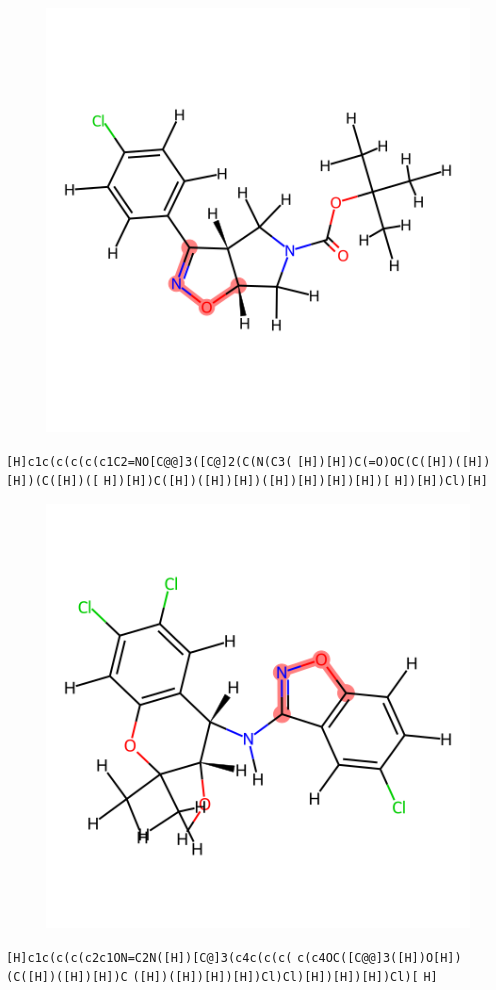 \documentclass{article}
\begin{document}
\begin{figure}[ht]
\centering
    \includegraphics{mol16.png}
\end{figure}
\verb|[H]c1c(c(c(c(c1C2=NO[C@@]3([C@]2(C(N(C3(| \verb|[H])[H])C(=O)OC(C([H])([H])[H])(C([H])([| \verb|H])[H])C([H])([H])[H])([H])[H])[H])[H])[| \verb|H])[H])Cl)[H]|

\begin{figure}[ht]
\centering
    \includegraphics{mol17.png}
\end{figure}
\verb|[H]c1c(c(c(c2c1ON=C2N([H])[C@]3(c4c(c(c(| \verb|c(c4OC([C@@]3([H])O[H])(C([H])([H])[H])C| \verb|([H])([H])[H])[H])Cl)Cl)[H])[H])[H])Cl)[| \verb|H]|
\end{document}
